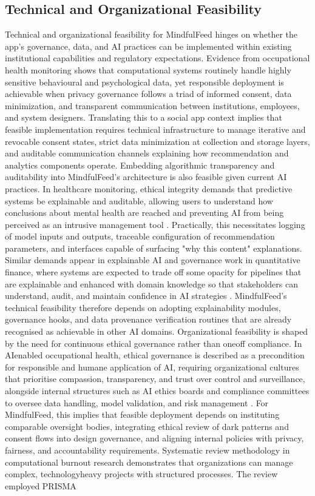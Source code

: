 \documentclass{article}
\begin{document}
\subsection{Technical and Organizational Feasibility}
\label{sec:tech_org_feasibility} Technical and organizational feasibility for MindfulFeed hinges on whether the app's governance, data, and AI practices can be implemented within existing institutional capabilities and regulatory expectations. Evidence from occupational health monitoring shows that computational systems routinely handle highly sensitive behavioural and psychological data, yet responsible deployment is achievable when privacy governance follows a triad of informed consent, data minimization, and transparent communication between institutions, employees, and system designers. Translating this to a social app context implies that feasible implementation requires technical infrastructure to manage iterative and revocable consent states, strict data minimization at collection and storage layers, and auditable communication channels explaining how recommendation and analytics components operate. Embedding algorithmic transparency and auditability into MindfulFeed's architecture is also feasible given current AI practices. In healthcare monitoring, ethical integrity demands that predictive systems be explainable and auditable, allowing users to understand how conclusions about mental health are reached and preventing AI from being perceived as an intrusive management tool \parencites[18]{8760542}. Practically, this necessitates logging of model inputs and outputs, traceable configuration of recommendation parameters, and interfaces capable of surfacing "why this content" explanations. Similar demands appear in explainable AI and governance work in quantitative finance, where systems are expected to trade off some opacity for pipelines that are explainable and enhanced with domain knowledge so that stakeholders can understand, audit, and maintain confidence in AI strategies \parencites[4]{9945186}. MindfulFeed's technical feasibility therefore depends on adopting explainability modules, governance hooks, and data provenance verification routines that are already recognised as achievable in other AI domains. Organizational feasibility is shaped by the need for continuous ethical governance rather than one\-off compliance. In AI\-enabled occupational health, ethical governance is described as a precondition for responsible and humane application of AI, requiring organizational cultures that prioritise compassion, transparency, and trust over control and surveillance, alongside internal structures such as AI ethics boards and compliance committees to oversee data handling, model validation, and risk management \parencites[18]{8760542}. For MindfulFeed, this implies that feasible deployment depends on instituting comparable oversight bodies, integrating ethical review of dark patterns and consent flows into design governance, and aligning internal policies with privacy, fairness, and accountability requirements. Systematic review methodology in computational burnout research demonstrates that organizations can manage complex, technology\-heavy projects with structured processes. The review employed PRISMA 
\end{document}
